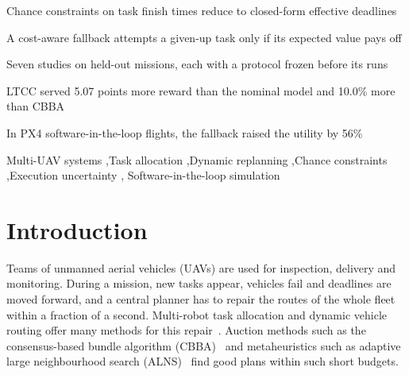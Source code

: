 \documentclass[a4paper,fleqn]{cas-dc}
\begin{document}
\begin{highlights}
\item Chance constraints on task finish times reduce to closed-form effective deadlines
\item A cost-aware fallback attempts a given-up task only if its expected value pays off
\item Seven studies on held-out missions, each with a protocol frozen before its runs
\item LTCC served 5.07 points more reward than the nominal model and 10.0\% more than CBBA
\item In PX4 software-in-the-loop flights, the fallback raised the utility by 56\%
\end{highlights}

\begin{keywords}
Multi-UAV systems \sep Task allocation \sep Dynamic replanning \sep Chance constraints \sep Execution uncertainty \sep
Software-in-the-loop simulation
\end{keywords}

\maketitle

\section{Introduction}\label{sec:intro}
Teams of unmanned aerial vehicles (UAVs) are used for inspection, delivery and monitoring. During a mission, new tasks
appear, vehicles fail and deadlines are moved forward, and a central planner has to repair the routes of the whole fleet
within a fraction of a second. Multi-robot task allocation and dynamic vehicle routing offer many methods for this
repair~\cite{gerkey2004formal,psaraftis2016dynamic,soeffker2022review,skaltsis2023review}. Auction methods such as the
consensus-based bundle algorithm (CBBA)~\cite{choi2009consensus} and metaheuristics such as adaptive large
neighbourhood search (ALNS)~\cite{ropke2006adaptive} find good plans within such short budgets.
\end{document}
